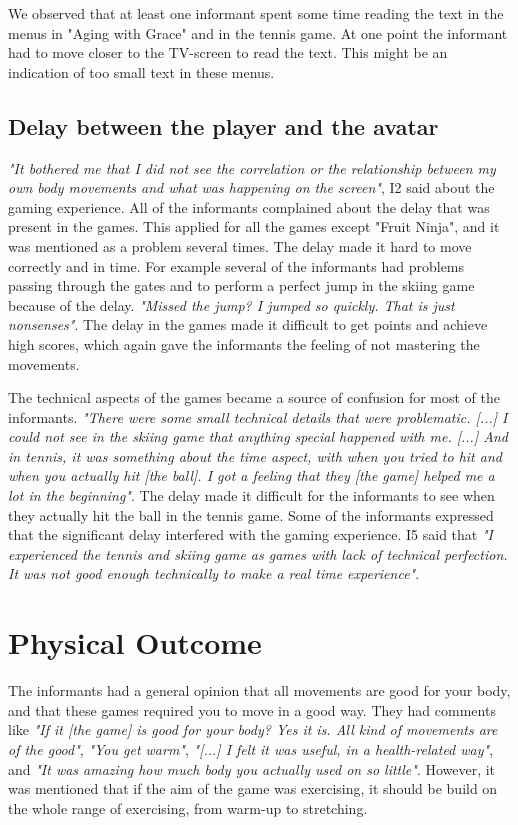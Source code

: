 We observed that at least one informant spent some time reading the text in the menus in "Aging with Grace" and in the tennis game. At one point the informant had to move closer to the TV-screen to read the text. This might be an indication of too small text in these menus. 

\subsection{Delay between the player and the avatar}

\emph{"It bothered me that I did not see the correlation or the relationship between my own body movements and what was happening on the screen"}, I2 said about the gaming experience. All of the informants complained about the delay that was present in the games. This applied for all the games except "Fruit Ninja", and it was mentioned as a problem several times. The delay made it hard to move correctly and in time. For example several of the informants had problems passing through the gates and to perform a perfect jump in the skiing game because of the delay. \emph{"Missed the jump? I jumped so quickly. That is just nonsenses"}. The delay in the games made it difficult to get points and achieve high scores, which again gave the informants the feeling of not mastering the movements. 

The technical aspects of the games became a source of confusion for most of the informants. \emph{"There were some small technical details that were problematic. [...] I could not see in the skiing game that anything special happened with me. [...] And in tennis, it was something about the time aspect, with when you tried to hit and when you actually hit [the ball]. I got a feeling that they [the game] helped me a lot in the beginning"}. The delay made it difficult for the informants to see when they actually hit the ball in the tennis game. Some of the informants expressed that the significant delay interfered with the gaming experience. I5 said that \emph{"I experienced the tennis and skiing game as games with lack of technical perfection. It was not good enough technically to make a real time experience"}. 

\section{Physical Outcome}

The informants had a general opinion that all movements are good for your body, and that these games required you to move in a good way. They had comments like \emph{"If it [the game] is good for your body? Yes it is. All kind of movements are of the good"}, \emph{"You get warm"}, \emph{"[...] I felt it was useful, in a health-related way"}, and \emph{"It was amazing how much body you actually used on so little"}. However, it was mentioned that if the aim of the game was exercising, it should be build on the whole range of exercising, from warm-up to stretching. 

